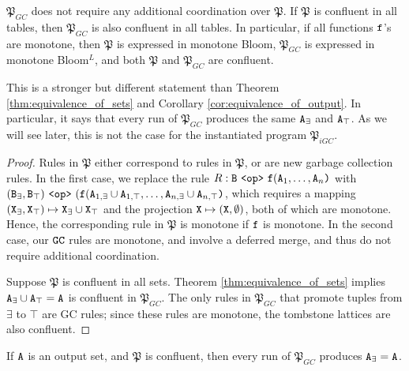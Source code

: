 \begin{thm}
\label{thm:coord-free}
$\mathfrak{P}_{GC}$ does not require any additional coordination over $\mathfrak{P}$.
If $\mathfrak{P}$ is confluent in all tables, then $\mathfrak{P}_{GC}$ is also confluent in all tables.
In particular, if all functions $\tt{f}$'s are monotone, then $\mathfrak{P}$ is expressed in monotone Bloom, $\mathfrak{P}_{GC}$ is expressed in monotone Bloom$^L$, and both $\mathfrak{P}$ and $\mathfrak{P}_{GC}$ are confluent.
\end{thm}
\begin{rmk}
This is a stronger but different statement than Theorem \ref{thm:equivalence_of_sets} and Corollary \ref{cor:equivalence_of_output}.
In particular, it says that every run of $\mathfrak{P}_{GC}$ produces the same $\tt{A}_\exists$ and $\tt{A}_\top$.
As we will see later, this is not the case for the instantiated program $\mathfrak{P}_{iGC}$.
\end{rmk}
\begin{proof}
Rules in $\mathfrak{P}$ either correspond to rules in $\mathfrak{P}$, or are new garbage collection rules.
In the first case, we replace the rule $R: \tt{B} ~\tt{<op>}~ \tt{f}(\tt{A}_1,\dots,\tt{A}_n\tt{)}$ with $(\tt{B}_\exists, \tt{B}_\top) ~\tt{<op>}~ (\tt{f}(\tt{A}_{1,\exists} \cup \tt{A}_{1,\top}, \dots, \tt{A}_{n,\exists} \cup \tt{A}_{n,\top} \tt{)}$, which requires a mapping $(\tt{X}_\exists, \tt{X}_\top) \mapsto \tt{X}_\exists \cup \tt{X}_\top$ and the projection $\tt{X} \mapsto (\tt{X}, \emptyset)$, both of which are monotone.
Hence, the corresponding rule in $\mathfrak{P}$ is monotone if $\tt{f}$ is monotone.
In the second case, our $\tt{GC}$ rules are monotone, and involve a deferred merge, and thus do not require additional coordination.

Suppose $\mathfrak{P}$ is confluent in all sets.
Theorem \ref{thm:equivalence_of_sets} implies $\tt{A}_{\exists} \cup \tt{A}_\top = \tt{A}$ is confluent in $\mathfrak{P}_{GC}$.
The only rules in $\mathfrak{P}_{GC}$ that promote tuples from $\exists$ to $\top$ are GC rules; since these rules are monotone, the tombstone lattices are also confluent.
\end{proof}

\begin{cor}
\label{cor:confluence_of_output}
If $\tt{A}$ is an output set, and $\mathfrak{P}$ is confluent, then every run of $\mathfrak{P}_{GC}$ produces $\tt{A}_\exists = \tt{A}$.
\end{cor}


